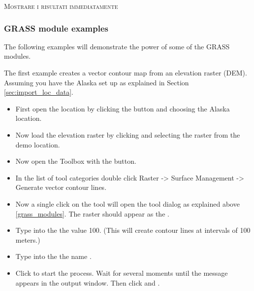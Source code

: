 \begin{Tip}\caption{\textsc{Mostrare i risultati immediatamente}}
\end{Tip} 

\subsubsection{GRASS module examples}
The following examples will demonstrate the power of some of the GRASS modules. 


The first example creates a vector contour map from an elevation raster
(DEM). Assuming you have the Alaska  set up as explained
in Section \ref{sec:import_loc_data}. 

\begin{itemize}
\item First open the location by clicking the
 button and choosing the Alaska
location. 
\item Now load the  elevation raster by clicking
 and selecting the
 raster from the demo location.
\item Now open the Toolbox with the  button. 
\item In the list of tool categories double click Raster -> Surface
Management -> Generate vector contour lines. 
\item Now a single click on the tool  will open
the tool dialog as explained above \ref{grass_modules}. The
 raster should appear as the . 
\item Type into the  the
value 100. (This will create contour lines at intervals of
100 meters.)
\item Type into the 
the name . 
\item Click  to start the process. Wait for several moments until
the message  appears in the output window.
Then click  and . 
\end{itemize}

